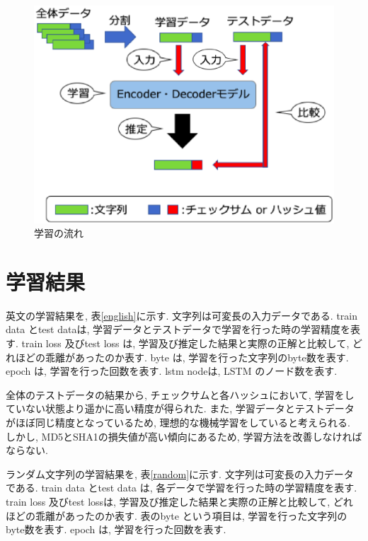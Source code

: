 \documentclass[11pt]{jbook}
\begin{document}
\begin{figure}[htbp]
\begin{center}
\includegraphics[width=130mm]{hantei.eps}
\caption{学習の流れ}
\label{gakusyu}
\end{center}
\end{figure}

\newpage

\section{学習結果}

英文の学習結果を, 表\ref{english}に示す.
文字列は可変長の入力データである.
train data とtest dataは, 学習データとテストデータで学習を行った時の学習精度を表す.
train loss 及びtest loss は, 学習及び推定した結果と実際の正解と比較して, どれほどの乖離があったのか表す.
byte は, 学習を行った文字列のbyte数を表す.
epoch は, 学習を行った回数を表す.
lstm nodeは, LSTM のノード数を表す.

全体のテストデータの結果から, チェックサムと各ハッシュにおいて, 学習をしていない状態より遥かに高い精度が得られた.
また, 学習データとテストデータがほぼ同じ精度となっているため, 理想的な機械学習をしていると考えられる.
しかし, MD5とSHA1の損失値が高い傾向にあるため, 学習方法を改善しなければならない.

ランダム文字列の学習結果を, 表\ref{random}に示す.
文字列は可変長の入力データである.
train data とtest data は, 各データで学習を行った時の学習精度を表す.
train loss 及びtest lossは, 学習及び推定した結果と実際の正解と比較して, どれほどの乖離があったのか表す.
表のbyte という項目は, 学習を行った文字列のbyte数を表す.
epoch は, 学習を行った回数を表す.
\end{document}
